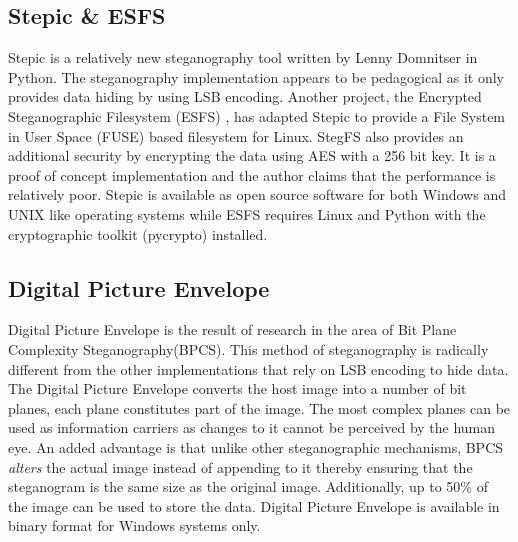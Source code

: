  \subsection{Stepic \& ESFS}
 Stepic \cite{stepnic} is a relatively new steganography tool written by Lenny Domnitser in Python. The steganography implementation appears to be pedagogical as it only provides data hiding by using LSB encoding. Another project, the Encrypted Steganographic Filesystem (ESFS) \cite{esfs}, has adapted Stepic to provide a File System in User Space (FUSE) based filesystem for Linux. StegFS also provides an additional security by encrypting the data using AES with a 256 bit key. It is a proof of concept implementation and the author claims that the performance is relatively poor. Stepic is available as open source software for both Windows and UNIX like operating systems while ESFS requires Linux and Python with the cryptographic toolkit (pycrypto) installed.
 \subsection{Digital Picture Envelope}
 Digital Picture Envelope is the result of research \cite{kawaguchi1998concept} in the area of Bit Plane Complexity Steganography(BPCS). This method of steganography is radically different from the other implementations that rely on LSB encoding to hide data. The Digital Picture Envelope converts the host image into a number of bit planes, each plane constitutes part of the image. The most complex planes can be used as information carriers as changes to it cannot be perceived by the human eye.  An added advantage is that unlike other steganographic mechanisms, BPCS \emph{alters} the actual image instead of appending to it thereby ensuring that the steganogram is the same size as the original image. Additionally, up to 50\% of the image can be used to store the data. Digital Picture Envelope is available in binary format for Windows systems only. 
 
